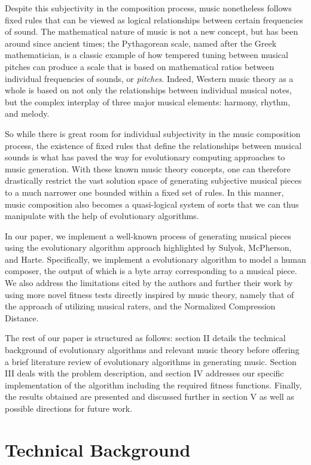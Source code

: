 \documentclass[conference]{IEEEtran}
\begin{document}
Despite this subjectivity in the composition process, music nonetheless follows fixed rules that can be viewed as logical relationships between certain frequencies of sound. The mathematical nature of music is not a new concept, but has been around since ancient times; the Pythagorean scale, named after the Greek mathematician, is a classic example of how tempered tuning between musical pitches can produce a scale that is based on mathematical ratios between individual frequencies of sounds, or \textit{pitches}. Indeed, Western music theory as a whole is based on not only the relationships between individual musical notes, but the complex interplay of three major musical elements: harmony, rhythm, and melody.

So while there is great room for individual subjectivity in the music composition process, the existence of fixed rules that define the relationships between musical sounds is what has paved the way for evolutionary computing approaches to music generation. With these known music theory concepts, one can therefore drastically restrict the vast solution space of generating subjective musical pieces to a much narrower one bounded within a fixed set of rules. In this manner, music composition also becomes a quasi-logical system of sorts that we can thus manipulate with the help of evolutionary algorithms.

In our paper, we implement a well-known process of generating musical pieces using the evolutionary algorithm approach highlighted by Sulyok, McPherson, and Harte\cite{b1}. Specifically, we implement a evolutionary algorithm to model a human composer, the output of which is a byte array corresponding to a musical piece. We also address the limitations cited by the authors and further their work by using more novel fitness tests directly inspired by music theory, namely that of the approach of utilizing musical raters,\cite{b2} and the Normalized Compression Distance\cite{b4}.

The rest of our paper is structured as follows: section II details the technical background of evolutionary algorithms and relevant music theory before offering a brief literature review of evolutionary algorithms in generating music. Section III deals with the problem description, and section IV addresses our specific implementation of the algorithm including the required fitness functions. Finally, the results obtained are presented and discussed further in section V as well as possible directions for future work.

\section{Technical Background}
\end{document}
